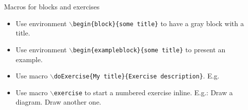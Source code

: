 \documentclass{beamer}
\begin{document}
\begin{slide}{Macros for blocks and exercises}
	\begin{itemize}
    \item Use environment \alert{\texttt{$\backslash$begin\{block\}\{some title\}}} to have a gray block with a title.

    \item Use environment \alert{\texttt{$\backslash$begin\{exampleblock\}\{some title\}}} to present an example.

    \item Use macro \alert{\texttt{$\backslash$doExercise\{My title\}\{Exercise description\}}}.
    E.g.

    \item Use macro \alert{\texttt{$\backslash$exercise}} to start a numbered exercise inline.
    E.g.: \exercise Draw a diagram. \exercise Draw another one.

  \end{itemize}
  
\end{slide}
\end{document}
